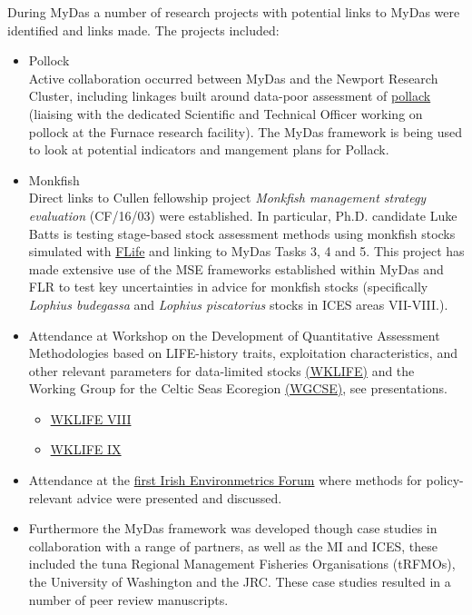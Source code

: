 During MyDas a number of research projects with potential links to MyDas were identified and links made. The projects included:

\begin{itemize}
 \item Pollock \\
 Active collaboration occurred between MyDas and the Newport Research Cluster, including linkages built around data-poor assessment of \href{https://3o2y9wugzp1kfxr5hvzgzq-on.drv.tw/MyDas/tasks/2/pollack.html}{pollack} (liaising with the dedicated Scientific and Technical Officer working on pollock at the Furnace research facility). The MyDas framework is being used to look at potential indicators and mangement plans for Pollack.
 \item Monkfish\\
 Direct links to Cullen fellowship project \emph{Monkfish management strategy evaluation} (CF/16/03) were established. In particular, Ph.D. candidate Luke Batts is testing stage-based stock assessment methods using monkfish stocks simulated with \href{https://github.com/flr/flife}{FLife} and linking to MyDas Tasks 3, 4 and 5. This project has made extensive use of the MSE frameworks established within MyDas and FLR to test key uncertainties in advice for monkfish stocks (specifically \textit{Lophius budegassa} and \textit{Lophius piscatorius} stocks in ICES areas VII-VIII.). 
  \item Attendance at Workshop on the Development of Quantitative Assessment Methodologies based on LIFE-history traits, exploitation characteristics, and other relevant parameters for data-limited stocks \href{https://www.ices.dk/community/groups/Pages/WKLIFEIX.aspx}{(WKLIFE)} and the Working Group for the Celtic Seas Ecoregion \href{https://www.ices.dk/community/groups/Pages/WGCSE.aspx}{(WGCSE)}, see presentations.
  \begin{itemize}
   \item \href{https://3o2y9wugzp1kfxr5hvzgzq-on.drv.tw/MyDas/presentations/mydas-wklifeix.html}{WKLIFE VIII}
   \item \href{https://3o2y9wugzp1kfxr5hvzgzq-on.drv.tw/MyDas/presentations/mydas-wklifeviii.html}{WKLIFE IX} 
 \end{itemize}
 \item Attendance at the \href{https://www.marine.ie/Home/site-area/news-events/news/first-environmetrics-forum-data-experts-ireland}{first Irish Environmetrics Forum} where methods for policy-relevant advice were presented and discussed.
 \item Furthermore the MyDas framework was developed though case studies in collaboration with a range of partners, as well as the MI and ICES, these included the tuna Regional Management Fisheries Organisations (tRFMOs), the University of Washington and the JRC. These case studies resulted in a number of peer review manuscripts.
 \end{itemize} 


